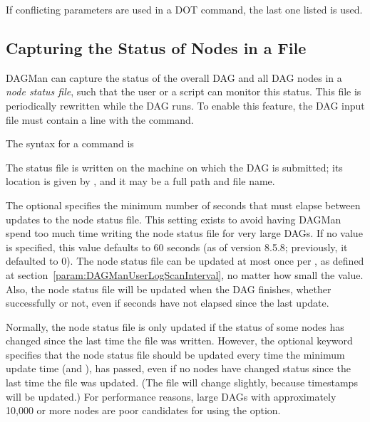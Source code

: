 If conflicting parameters are used in a DOT command, the last one
listed is used.

\subsection{\label{sec:DAG-node-status}Capturing the Status of Nodes in a File}

DAGMan can capture the status of the overall DAG and all DAG nodes
in a \emph{node status file},
such that the user or a script can monitor this status.
This file is periodically rewritten
while the DAG runs.
To enable this feature, the DAG input file must contain a line with the
 command.

The syntax for a  command is

  

The status file is written on the machine on which the DAG is submitted;
its location is given by ,
and it may be a full path and file name.

The optional  specifies the minimum number of seconds
that must elapse between updates to the node status file.
This setting exists to avoid having DAGMan spend too much time writing
the node status file for very large DAGs.
If no value is specified, this value defaults to 60 seconds (as
of version 8.5.8; previously, it defaulted to 0).
The node status file can be updated at most once
per ,
as defined at section~\ref{param:DAGManUserLogScanInterval},
no matter how small the  value.
Also, the node status file will be updated when the DAG finishes,
whether successfully or not, even if  seconds
have not elapsed since the last update.

Normally, the node status file is only updated if the status of
some nodes has changed since the last time the file was written.
However, the optional  keyword specifies that the
node status file should be updated every time the minimum update
time (and ),
has passed, even if no nodes have changed status since the last
time the file was updated.
(The file will change slightly,
because timestamps will be updated.)
For performance reasons,
large DAGs with approximately 10,000 or more nodes
are poor candidates for using the  option.

